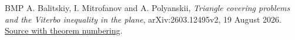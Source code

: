 \documentclass[a4paper,11pt]{article}
\begin{document}

\begin{thebibliography}{BMP}
A. Balitskiy, I. Mitrofanov and A. Polyanskii,
\emph{Triangle covering problems and the Viterbo inequality in the plane},
arXiv:2603.12495v2, 19 August 2026.
\href{https://arxiv.org/html/2603.12495v2}{Source with theorem numbering}.
\end{thebibliography}
\end{document}
